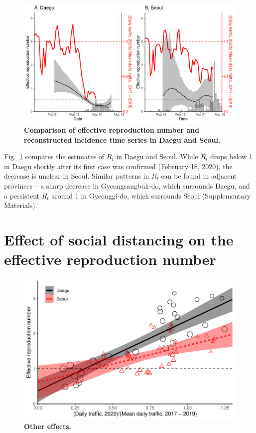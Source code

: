 \documentclass[12pt]{article}
\newcommand{\fref}[1]{Fig.~\ref{fig:#1}}
\begin{document}
\begin{figure}[!ht]
\includegraphics[width=\textwidth]{figure_compare_R_t.pdf}
\caption{
\textbf{Comparison of effective reproduction number and reconstructed incidence time series in Daegu and Seoul.}
}
\label{fig:eff}
\end{figure}

\fref{eff} compares the estimates of $R_t$ in Daegu and Seoul.
While $R_t$ drops below 1 in Daegu shortly after its first case was confirmed (February 18, 2020), 
the decrease is unclear in Seoul.
Similar patterns in $R_t$ can be found in adjacent provinces -- a sharp decrease in Gyeongsangbuk-do, which surrounds Daegu, and a persistent $R_t$ around 1 in Gyeonggi-do, which surrounds Seoul (Supplementary Materials).

\section{Effect of social distancing on the effective reproduction number}

\begin{figure}[!ht]
\includegraphics[width=\textwidth]{figure_traffic_regression.pdf}
\caption{
\textbf{Other effects.}
}
\label{fig:traffic}
\end{figure}
\end{document}
